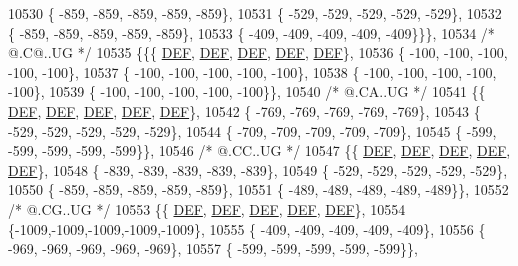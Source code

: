 \begin{DoxyCode}
10530 \{ -859, -859, -859, -859, -859\},
10531 \{ -529, -529, -529, -529, -529\},
10532 \{ -859, -859, -859, -859, -859\},
10533 \{ -409, -409, -409, -409, -409\}\}\},
10534 \textcolor{comment}{/*  @.C@..UG */}
10535 \{\{\{  \mbox{\hyperlink{1_88_84__epars_8h_a397419fc12b37ed479c8abb9d444d843}{DEF}},  \mbox{\hyperlink{1_88_84__epars_8h_a397419fc12b37ed479c8abb9d444d843}{DEF}},  \mbox{\hyperlink{1_88_84__epars_8h_a397419fc12b37ed479c8abb9d444d843}{DEF}},  \mbox{\hyperlink{1_88_84__epars_8h_a397419fc12b37ed479c8abb9d444d843}{DEF}},  \mbox{\hyperlink{1_88_84__epars_8h_a397419fc12b37ed479c8abb9d444d843}{DEF}}\},
10536 \{ -100, -100, -100, -100, -100\},
10537 \{ -100, -100, -100, -100, -100\},
10538 \{ -100, -100, -100, -100, -100\},
10539 \{ -100, -100, -100, -100, -100\}\},
10540 \textcolor{comment}{/*  @.CA..UG */}
10541 \{\{  \mbox{\hyperlink{1_88_84__epars_8h_a397419fc12b37ed479c8abb9d444d843}{DEF}},  \mbox{\hyperlink{1_88_84__epars_8h_a397419fc12b37ed479c8abb9d444d843}{DEF}},  \mbox{\hyperlink{1_88_84__epars_8h_a397419fc12b37ed479c8abb9d444d843}{DEF}},  \mbox{\hyperlink{1_88_84__epars_8h_a397419fc12b37ed479c8abb9d444d843}{DEF}},  \mbox{\hyperlink{1_88_84__epars_8h_a397419fc12b37ed479c8abb9d444d843}{DEF}}\},
10542 \{ -769, -769, -769, -769, -769\},
10543 \{ -529, -529, -529, -529, -529\},
10544 \{ -709, -709, -709, -709, -709\},
10545 \{ -599, -599, -599, -599, -599\}\},
10546 \textcolor{comment}{/*  @.CC..UG */}
10547 \{\{  \mbox{\hyperlink{1_88_84__epars_8h_a397419fc12b37ed479c8abb9d444d843}{DEF}},  \mbox{\hyperlink{1_88_84__epars_8h_a397419fc12b37ed479c8abb9d444d843}{DEF}},  \mbox{\hyperlink{1_88_84__epars_8h_a397419fc12b37ed479c8abb9d444d843}{DEF}},  \mbox{\hyperlink{1_88_84__epars_8h_a397419fc12b37ed479c8abb9d444d843}{DEF}},  \mbox{\hyperlink{1_88_84__epars_8h_a397419fc12b37ed479c8abb9d444d843}{DEF}}\},
10548 \{ -839, -839, -839, -839, -839\},
10549 \{ -529, -529, -529, -529, -529\},
10550 \{ -859, -859, -859, -859, -859\},
10551 \{ -489, -489, -489, -489, -489\}\},
10552 \textcolor{comment}{/*  @.CG..UG */}
10553 \{\{  \mbox{\hyperlink{1_88_84__epars_8h_a397419fc12b37ed479c8abb9d444d843}{DEF}},  \mbox{\hyperlink{1_88_84__epars_8h_a397419fc12b37ed479c8abb9d444d843}{DEF}},  \mbox{\hyperlink{1_88_84__epars_8h_a397419fc12b37ed479c8abb9d444d843}{DEF}},  \mbox{\hyperlink{1_88_84__epars_8h_a397419fc12b37ed479c8abb9d444d843}{DEF}},  \mbox{\hyperlink{1_88_84__epars_8h_a397419fc12b37ed479c8abb9d444d843}{DEF}}\},
10554 \{-1009,-1009,-1009,-1009,-1009\},
10555 \{ -409, -409, -409, -409, -409\},
10556 \{ -969, -969, -969, -969, -969\},
10557 \{ -599, -599, -599, -599, -599\}\},

\end{DoxyCode}
